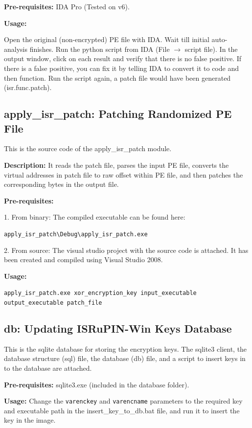 \documentclass[a4paper,12pt]{llncs}
\begin{document}
\textbf{Pre-requisites:}
IDA Pro (Tested on v6).

\textbf{Usage:}

Open the original (non-encrypted) PE file with IDA. Wait till initial
auto-analysis finishes. Run the python script from IDA (File $\rightarrow$ script file).
In the output window, click on each result and verify that there is no
false positive. If there is a false positive, you can fix it by telling
IDA to convert it to code and then function. Run the script again, a
patch file would have been generated (isr.func.patch).

\subsection{apply\_isr\_patch: Patching Randomized PE File}
This is the source code of the apply\_isr\_patch module.

\textbf{Description:}
It reads the patch file,
parses the input PE file, converts the virtual addresses in patch file
to raw offset within PE file, and then patches the corresponding bytes
in the output file.

\textbf{Pre-requisites:}

1. From binary: The compiled executable can be found here:

{\small \texttt{apply\_isr\_patch{\textbackslash}Debug{\textbackslash}apply\_isr\_patch.exe}}

2. From source: The visual studio project with the source code is attached. It has been created
and compiled using Visual Studio 2008.

\textbf{Usage:}

{\small \texttt{apply\_isr\_patch.exe xor\_encryption\_key input\_executable output\_executable patch\_file}}

\subsection{db: Updating ISRuPIN-Win Keys Database}
This is the sqlite database for storing the encryption keys. The sqlite3 client,
the database structure (sql) file, the database (db) file, and a script to
insert keys in to the database are attached.

\textbf{Pre-requisites:}
sqlite3.exe (included in the database folder).

\textbf{Usage:}
Change the \texttt{varenckey} and \texttt{varencname} parameters to the required key and executable path
in the insert\_key\_to\_db.bat file, and run it to insert the key in the image.
\end{document}
